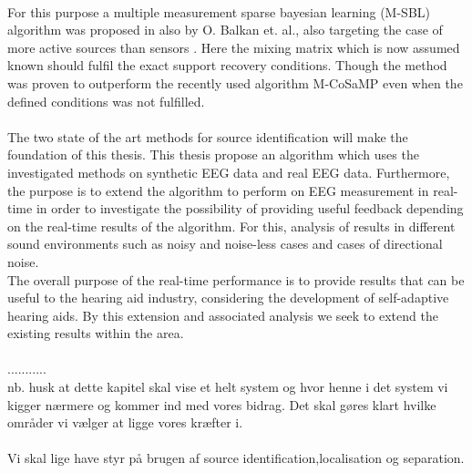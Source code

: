\\
For this purpose a multiple measurement sparse bayesian learning (M-SBL) algorithm was proposed in \cite{Balkan2014} also by O. Balkan et. al., also targeting the case of more active sources than sensors \cite{Balkan2014}. Here the mixing matrix which is now assumed known should fulfil the exact support recovery conditions. Though the method was proven to outperform the recently used algorithm M-CoSaMP even when the defined conditions was not fulfilled.  
\\   
\\
The two state of the art methods for source identification will make the foundation of this thesis. This thesis propose an algorithm which uses the investigated methods on synthetic EEG data and real EEG data. Furthermore, the purpose is to extend the algorithm to perform on EEG measurement in real-time in order to investigate the possibility of providing useful feedback depending on the real-time results of the algorithm. For this, analysis of results in different sound environments such as noisy and noise-less cases and cases of directional noise.
\\
The overall purpose of the real-time performance is to provide results that can be useful to the hearing aid industry, considering the development of self-adaptive hearing aids. By this extension and associated analysis we seek to extend the existing results within the area.   
\\ \\
...........\\
nb. husk at dette kapitel skal vise et helt system og hvor henne i det system vi kigger nærmere og kommer ind med vores bidrag. Det skal gøres klart hvilke områder vi vælger at ligge vores kræfter i.  \\
\\
Vi skal lige have styr på brugen af source identification,localisation og separation. 





 
